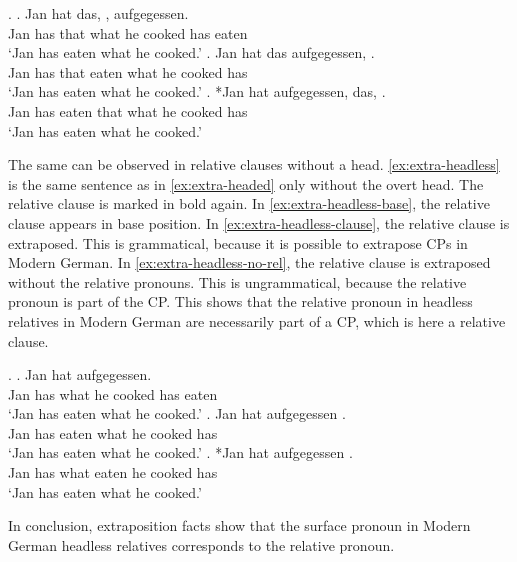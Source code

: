 \ex.\label{ex:extra-headed}
\ag. Jan hat das,    , aufgegessen.\\
Jan has that what he cooked has eaten\\
`Jan has eaten what he cooked.'\label{ex:extra-headed-base}
\bg. Jan hat das aufgegessen,    .\\
Jan has that eaten what he cooked has\\
`Jan has eaten what he cooked.'\label{ex:extra-headed-only-clause}
\cg. *Jan hat aufgegessen, das,    .\\
Jan has eaten that what he cooked has\\
`Jan has eaten what he cooked.'\label{ex:extra-headed-head-clause} 

The same can be observed in relative clauses without a head. \ref{ex:extra-headless} is the same sentence as in \ref{ex:extra-headed} only without the overt head. The relative clause is marked in bold again.
In \ref{ex:extra-headless-base}, the relative clause appears in base position. In \ref{ex:extra-headless-clause}, the relative clause is extraposed. This is grammatical, because it is possible to extrapose CPs in Modern German. In \ref{ex:extra-headless-no-rel}, the relative clause is extraposed without the relative pronouns. This is ungrammatical, because the relative pronoun is part of the CP.
This shows that the relative pronoun in headless relatives in Modern German are necessarily part of a CP, which is here a relative clause.

\ex.\label{ex:extra-headless}
\ag. Jan hat     aufgegessen.\\
Jan has what he cooked has eaten\\
`Jan has eaten what he cooked.'\label{ex:extra-headless-base}
\bg. Jan hat aufgegessen    .\\
Jan has eaten what he cooked has\\
`Jan has eaten what he cooked.'\label{ex:extra-headless-clause}
\bg. *Jan hat  aufgegessen   .\\
Jan has what eaten he cooked has\\
`Jan has eaten what he cooked.'\label{ex:extra-headless-no-rel}

In conclusion, extraposition facts show that the surface pronoun in Modern German headless relatives corresponds to the relative pronoun.

